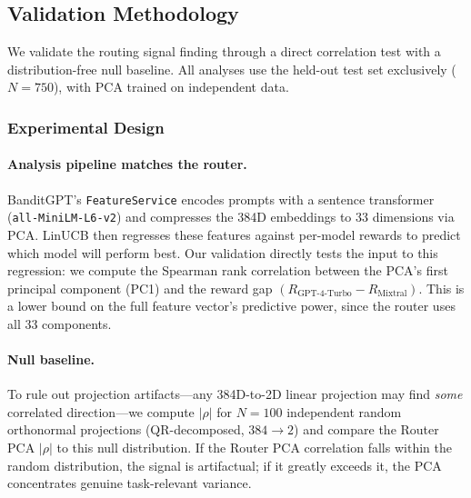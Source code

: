 
\subsection{Validation Methodology}
\label{sec:validation_methodology}

We validate the routing signal finding through a direct correlation test with a distribution-free null baseline.
All analyses use the held-out test set exclusively ($N=750$), with PCA trained on independent data.

\subsubsection{Experimental Design}

\paragraph{Analysis pipeline matches the router.}
BanditGPT's \texttt{FeatureService} encodes prompts with a sentence transformer (\texttt{all-MiniLM-L6-v2}) and compresses the 384D embeddings to 33 dimensions via PCA.
LinUCB then regresses these features against per-model rewards to predict which model will perform best.
Our validation directly tests the input to this regression: we compute the Spearman rank correlation between the PCA's first principal component (PC1) and the reward gap $(R_{\text{GPT-4-Turbo}} - R_{\text{Mixtral}})$.
This is a lower bound on the full feature vector's predictive power, since the router uses all 33 components.

\paragraph{Null baseline.}
To rule out projection artifacts---any 384D-to-2D linear projection may find \emph{some} correlated direction---we compute $|\rho|$ for $N{=}100$ independent random orthonormal projections (QR-decomposed, $384 \to 2$) and compare the Router PCA $|\rho|$ to this null distribution.
If the Router PCA correlation falls within the random distribution, the signal is artifactual; if it greatly exceeds it, the PCA concentrates genuine task-relevant variance.

